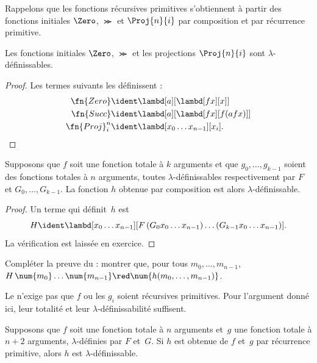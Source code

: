 \documentclass[../../../include/open-logic-section]{subfiles}
\begin{document}

Rappelons que les fonctions récursives
primitives s'obtiennent à partir des
fonctions initiales $\Zero$, $\Succ$ et
$\Proj{n}{i}$ par composition et par
récurrence primitive.

\begin{lem}
Les fonctions initiales $\Zero$,
$\Succ$ et les projections
$\Proj{n}{i}$ sont $\lambda$-définissables.
\end{lem}

\begin{proof}
Les termes suivants les définissent :
\begin{align*}
  \fn{Zero} & \ident
    \lambd[a][\lambd[fx][x]]\\
  \fn{Succ} & \ident
    \lambd[a][\lambd[fx][f(a f x)]]\\
  \fn{Proj}^n_i & \ident
    \lambd[x_0\dots x_{n-1}][x_i].
\end{align*}
\end{proof}

\begin{lem}
Supposons que $f$ soit une fonction
totale à $k$ arguments et que
$g_0,\dots,g_{k-1}$ soient des fonctions
totales à $n$ arguments, toutes
$\lambda$-définissables respectivement
par $F$ et $G_0,\dots,G_{k-1}$.
La fonction $h$ obtenue par composition
est alors $\lambda$-définissable.
\end{lem}

\begin{proof}
Un terme qui définit~$h$ est
\[
  H \ident
  \lambd[x_0\dots x_{n-1}]
    [F\,(G_0 x_0\dots x_{n-1})
       \dots(G_{k-1}x_0\dots x_{n-1})].
\]
La vérification est laissée en exercice.
\end{proof}

\begin{prob}
Compléter la preuve du
 : montrer
que, pour tous $m_0,\dots,m_{n-1}$,
$H\,\num{m_0}\dots\num{m_{n-1}}
\red\num{h(m_0,\dots,m_{n-1})}$.
\end{prob}

Le  n'exige pas
que $f$ ou les $g_i$ soient récursives
primitives. Pour l'argument donné ici,
leur totalité et leur
$\lambda$-définissabilité suffisent.

\begin{lem}
Supposons que $f$ soit une fonction
totale à $n$ arguments et~$g$ une
fonction totale à $n+2$ arguments,
$\lambda$-définies par $F$ et~$G$.
Si $h$ est obtenue de $f$ et~$g$
par récurrence primitive, alors $h$
est $\lambda$-définissable.
\end{lem}
\end{document}
